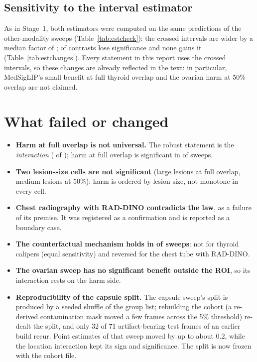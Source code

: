\subsection{Sensitivity to the interval estimator}
As in Stage~1, both estimators were computed on the same predictions of the other-modality sweeps
(Table~\ref{tab:estcheck}): the crossed intervals are wider by a median factor of \sTwoEstMed; \sTwoEstLost{} of
\sTwoEstN{} contrasts lose significance and none gains it (Table~\ref{tab:estchanges}). Every statement in this report
uses the crossed intervals, so these changes are already reflected in the text: in particular, MedSigLIP's small benefit
at full thyroid overlap and the ovarian harm at 50\% overlap are not claimed.



\section{What failed or changed}\label{sec:changed}
\begin{itemize}[leftmargin=*]\itemsep1pt
\item \textbf{Harm at full overlap is not universal.} The robust statement is the \emph{interaction} (\sTwoNInterPos{}
of \sTwoNSweeps); harm at full overlap is significant in \sTwoNHarmFull{} of \sTwoNSweeps{} sweeps.
\item \textbf{Two lesion-size cells are not significant} (large lesions at full overlap, medium lesions at 50\%): harm
is ordered by lesion size, not monotone in every cell.
\item \textbf{Chest radiography with RAD-DINO contradicts the law}, as a failure of its premise. It was registered as a
confirmation and is reported as a boundary case.
\item \textbf{The counterfactual mechanism holds in \sTwoCfNPos{} of \sTwoCfN{} sweeps}: not for thyroid calipers (equal
sensitivity) and reversed for the chest tube with RAD-DINO.
\item \textbf{The ovarian sweep has no significant benefit outside the ROI}, so its interaction rests on the harm side.
\item \textbf{Reproducibility of the capsule split.} The capsule sweep's split is produced by a seeded shuffle of the
group list; rebuilding the cohort (a re-derived contamination mask moved a few frames across the 5\% threshold) re-dealt
the split, and only 32 of 71 artifact-bearing test frames of an earlier build recur. Point estimates of that sweep moved
by up to about 0.2, while the location interaction kept its sign and significance. The split is now frozen with the
cohort file.
\end{itemize}

